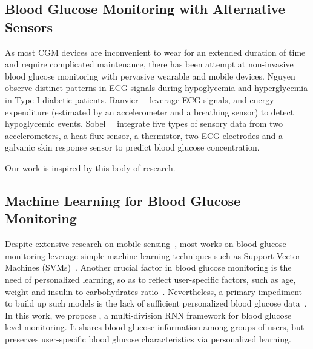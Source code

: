 \subsection{Blood Glucose Monitoring with Alternative Sensors}
As most CGM devices are inconvenient to wear for an extended duration of time and require complicated maintenance, there has been attempt at non-invasive blood glucose monitoring with pervasive wearable and mobile devices.
Nguyen~\etal~\cite{bib:EMBC12:Nguyen} observe distinct patterns in ECG signals during hypoglycemia and hyperglycemia in Type I diabetic patients.
Ranvier~\etal~\cite{bib:SEMPER16:Ranvier} leverage ECG signals, and energy expenditure (estimated by an accelerometer and a breathing sensor) to detect hypoglycemic events.
Sobel~\etal~\cite{bib:JDST14:Sobel} integrate five types of sensory data from two accelerometers, a heat-flux sensor, a thermistor, two ECG electrodes and a galvanic skin response sensor to predict blood glucose concentration.

Our work is inspired by this body of research. 

\subsection{Machine Learning for Blood Glucose Monitoring}
Despite extensive research on mobile sensing~\cite{bib:COMMAG10:Lane10}, most works on blood glucose monitoring leverage simple machine learning techniques such as Support Vector Machines (SVMs)~\cite{bib:MAIHA14:Plis}.
Another crucial factor in blood glucose monitoring is the need of personalized learning, so as to reflect user-specific factors, such as age, weight and insulin-to-carbohydrates ratio~\cite{bib:IJNMBE16:Oviedo}.
Nevertheless, a primary impediment to build up such models is the lack of sufficient personalized blood glucose data~\cite{bib:KDHealth16:Marling}.
In this work, we propose \modelname, a multi-division RNN framework for blood glucose level monitoring.
It shares blood glucose information among groups of users, but preserves user-specific blood glucose characteristics via personalized learning.




